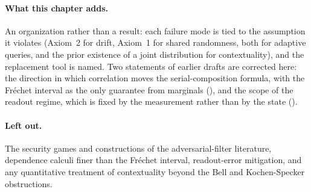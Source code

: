 \paragraph{What this chapter adds.}
An organization rather than a result: each failure mode is tied to the
assumption it violates (Axiom~2 for drift, Axiom~1 for shared randomness,
both for adaptive queries, and the prior existence of a joint distribution
for contextuality), and the replacement tool is named. Two statements of
earlier drafts are corrected here: the direction in which correlation
moves the serial-composition formula, with the Fr\'echet interval as the
only guarantee from marginals (),
and the scope of the readout regime, which is fixed by the measurement
rather than by the state ().

\paragraph{Left out.}
The security games and constructions of the adversarial-filter
literature, dependence calculi finer than the Fr\'echet interval,
readout-error mitigation, and any quantitative treatment of contextuality
beyond the Bell and Kochen-Specker obstructions.
